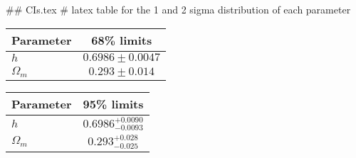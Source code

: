 ## CIs.tex
# latex table for the 1 and 2 sigma distribution of each parameter

\begin{tabular} { l  c}
 Parameter &  68\% limits\\
\hline
{\boldmath$h              $} & $0.6986\pm 0.0047          $\\
{\boldmath$\Omega_m       $} & $0.293\pm 0.014            $\\
\hline
\end{tabular}

\begin{tabular} { l  c}
 Parameter &  95\% limits\\
\hline
{\boldmath$h              $} & $0.6986^{+0.0090}_{-0.0093}$\\
{\boldmath$\Omega_m       $} & $0.293^{+0.028}_{-0.025}   $\\
\hline
\end{tabular}
